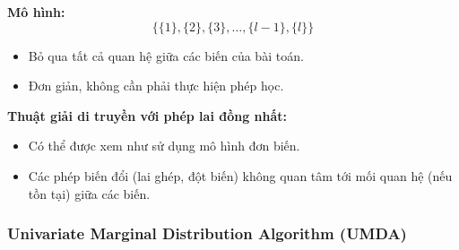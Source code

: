 \documentclass{book}
\begin{document}
        \textbf{Mô hình:}
        \[
        \{\{1\}, \{2\}, \{3\}, \ldots, \{l-1\}, \{l\}\}
        \]
        \begin{itemize}
            \item Bỏ qua tất cả quan hệ giữa các biến của bài toán.
            \item Đơn giản, không cần phải thực hiện phép học.
        \end{itemize}
        \textbf{Thuật giải di truyền với phép lai đồng nhất:}
        \begin{itemize}
            \item Có thể được xem như sử dụng mô hình đơn biến.
            \item Các phép biến đổi (lai ghép, đột biến) không quan tâm tới mối quan hệ (nếu tồn tại) giữa các biến.
        \end{itemize}
        
            \subsubsection{Univariate Marginal Distribution Algorithm (UMDA)} 
            
\end{document}

